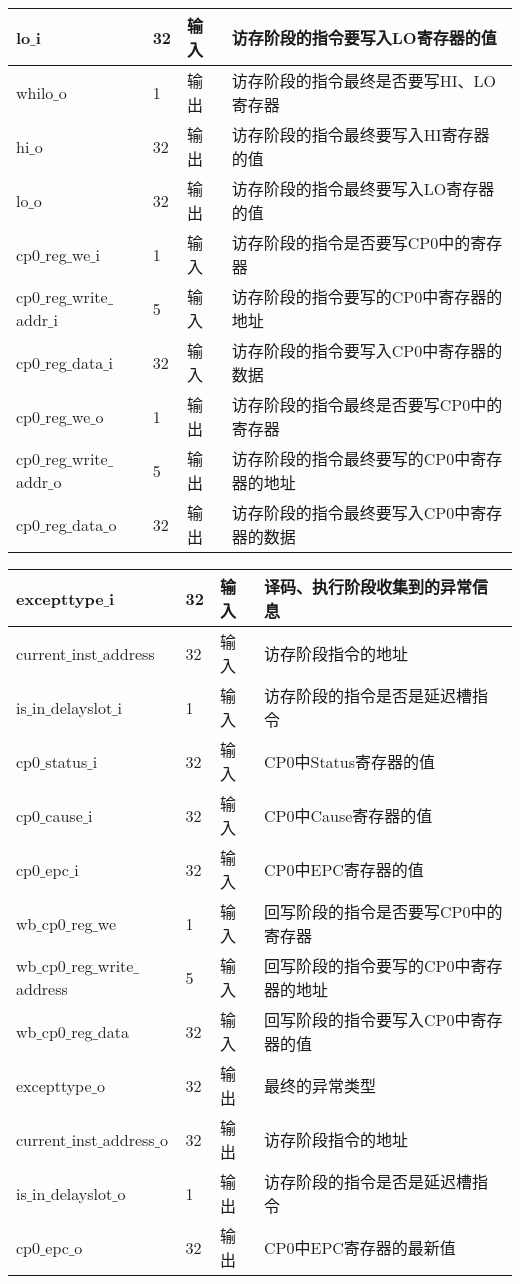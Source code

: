 \begin{table}[H]
\begin{tabular}{|l|l|l|l|}
		\hline
		lo$\_$i & 32 & 输入 & 访存阶段的指令要写入LO寄存器的值 \\
		\hline
		whilo$\_$o & 1 & 输出 & 访存阶段的指令最终是否要写HI、LO寄存器 \\
		\hline
		hi$\_$o & 32 & 输出 & 访存阶段的指令最终要写入HI寄存器的值 \\
		\hline
		lo$\_$o & 32 & 输出 & 访存阶段的指令最终要写入LO寄存器的值 \\
		\hline
		cp0$\_$reg$\_$we$\_$i & 1 & 输入 & 访存阶段的指令是否要写CP0中的寄存器 \\
		\hline
		cp0$\_$reg$\_$write$\_$addr$\_$i & 5 & 输入 & 访存阶段的指令要写的CP0中寄存器的地址 \\
		\hline
		cp0$\_$reg$\_$data$\_$i & 32 & 输入 & 访存阶段的指令要写入CP0中寄存器的数据 \\
		\hline
		cp0$\_$reg$\_$we$\_$o & 1 & 输出 & 访存阶段的指令最终是否要写CP0中的寄存器 \\
		\hline
		cp0$\_$reg$\_$write$\_$addr$\_$o & 5 & 输出 & 访存阶段的指令最终要写的CP0中寄存器的地址 \\
		\hline
		cp0$\_$reg$\_$data$\_$o & 32 & 输出 & 访存阶段的指令最终要写入CP0中寄存器的数据 \\
		\hline
	\end{tabular}
\end{table}
\begin{table}[H]
	\centering
	\begin{tabular}{|l|l|l|l|}
		\hline
		excepttype$\_$i & 32 & 输入 & 译码、执行阶段收集到的异常信息 \\
		\hline
		current$\_$inst$\_$address & 32 & 输入 & 访存阶段指令的地址 \\
		\hline
		is$\_$in$\_$delayslot$\_$i & 1 & 输入 & 访存阶段的指令是否是延迟槽指令 \\
		\hline
		cp0$\_$status$\_$i & 32 & 输入 & CP0中Status寄存器的值 \\
		\hline
		cp0$\_$cause$\_$i & 32 & 输入 & CP0中Cause寄存器的值 \\
		\hline
		cp0$\_$epc$\_$i & 32 & 输入 & CP0中EPC寄存器的值 \\
		\hline
		wb$\_$cp0$\_$reg$\_$we & 1 & 输入 & 回写阶段的指令是否要写CP0中的寄存器 \\
		\hline
		wb$\_$cp0$\_$reg$\_$write$\_$address & 5 & 输入 & 回写阶段的指令要写的CP0中寄存器的地址 \\
		\hline
		wb$\_$cp0$\_$reg$\_$data & 32 & 输入 & 回写阶段的指令要写入CP0中寄存器的值 \\
		\hline
		excepttype$\_$o & 32 & 输出 & 最终的异常类型 \\
		\hline
		current$\_$inst$\_$address$\_$o & 32 & 输出 & 访存阶段指令的地址 \\
		\hline
		is$\_$in$\_$delayslot$\_$o & 1 & 输出 & 访存阶段的指令是否是延迟槽指令 \\
		\hline
		cp0$\_$epc$\_$o & 32 & 输出 & CP0中EPC寄存器的最新值 \\
		\hline
	\end{tabular}
\end{table}
